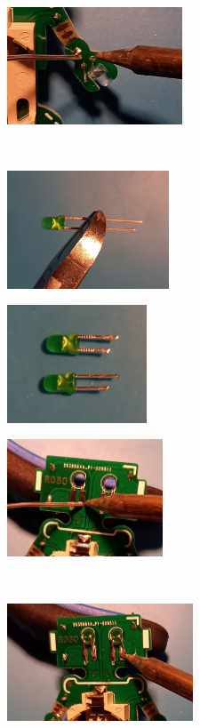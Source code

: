 \documentclass[a4paper]{article}
\begin{document}
\begin{minipage}[t]{0.33\textwidth}
  \centering
  \includegraphics[height=3.5cm]{../pictures/LED3.jpg}
  \label{img:LED3}
\end{minipage}
\ \\
\begin{minipage}[t]{0.33\textwidth}
  \centering
  \includegraphics[height=3.5cm]{../pictures/LED4.jpg}
  \label{img:LED4}
  \end{minipage}
\begin{minipage}[t]{0.33\textwidth}
  \centering
  \includegraphics[height=3.5cm]{../pictures/LED5.jpg}
  \label{img:LED5}
\end{minipage}
\begin{minipage}[t]{0.33\textwidth}
  \centering
  \includegraphics[height=3.5cm]{../pictures/LED6.jpg}
  \label{img:LED6}
\end{minipage}
\ \\
\begin{minipage}[t]{0.33\textwidth}
  \centering
  \includegraphics[height=3.5cm]{../pictures/LED7.jpg}
  \label{img:LED7}
  \end{minipage}
\end{document}
